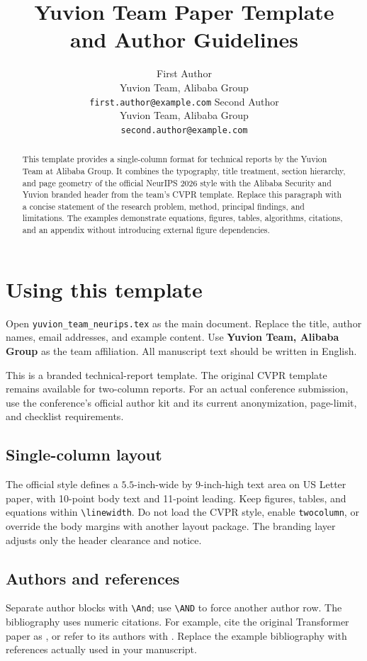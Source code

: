\documentclass[10pt,letterpaper]{article}
\title{Yuvion Team Paper Template\\and Author Guidelines}
\author{First Author\\
  Yuvion Team, Alibaba Group\\
  \texttt{first.author@example.com}
  \And
  Second Author\\
  Yuvion Team, Alibaba Group\\
  \texttt{second.author@example.com}}
\begin{document}
\maketitle
\pagestyle{yuvionheader}
\thispagestyle{yuvionheader}

\begin{abstract}
This template provides a single-column format for technical reports by the
Yuvion Team at Alibaba Group. It combines the typography, title treatment,
section hierarchy, and page geometry of the official NeurIPS 2026 style with
the Alibaba Security and Yuvion branded header from the team's CVPR template.
Replace this paragraph with a concise statement of the research problem,
method, principal findings, and limitations. The examples demonstrate
equations, figures, tables, algorithms, citations, and an appendix without
introducing external figure dependencies.
\end{abstract}

\section{Using this template}
\label{sec:intro}
Open \texttt{yuvion\_team\_neurips.tex} as the main document. Replace the
title, author names, email addresses, and example content. Use
\textbf{Yuvion Team, Alibaba Group} as the team affiliation. All manuscript
text should be written in English.

This is a branded technical-report template. The original CVPR template
remains available for two-column reports. For an actual conference
submission, use the conference's official author kit and its current
anonymization, page-limit, and checklist requirements.

\subsection{Single-column layout}
The official style defines a $5.5$-inch-wide by $9$-inch-high text area on
US Letter paper, with 10-point body text and 11-point leading. Keep figures,
tables, and equations within \verb|\linewidth|. Do not load the CVPR style,
enable \texttt{twocolumn}, or override the body margins with another layout
package. The branding layer adjusts only the header clearance and notice.

\subsection{Authors and references}
Separate author blocks with \verb|\And|; use \verb|\AND| to force another
author row. The bibliography uses numeric citations. For example, cite the
original Transformer paper as \citep{vaswani2017attention}, or refer to its
authors with \citet{vaswani2017attention}. Replace the example bibliography
with references actually used in your manuscript.
\end{document}
